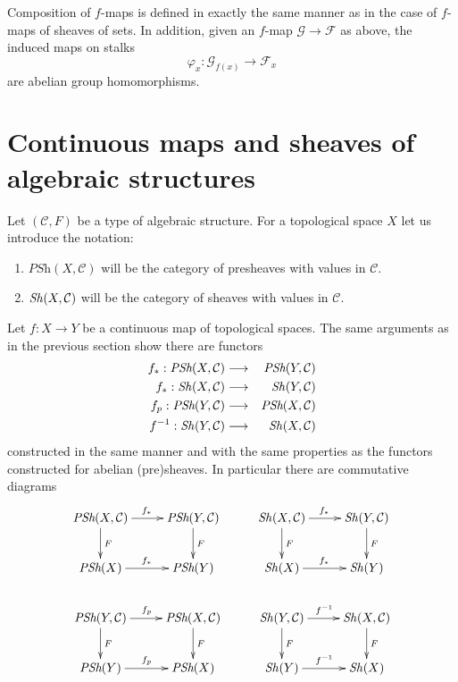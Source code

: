 \medskip\noindent
Composition of $f$-maps is defined in exactly the
same manner as in the case of $f$-maps of sheaves of
sets. In addition, given an $f$-map $\mathcal{G} \to \mathcal{F}$
as above, the induced maps on stalks
$$
\varphi_x : \mathcal{G}_{f(x)} \longrightarrow \mathcal{F}_x
$$
are abelian group homomorphisms.


\section{Continuous maps and sheaves of algebraic structures}
\label{section-presheaves-structures-functorial}

\noindent
Let $(\mathcal{C}, F)$ be a type of algebraic structure.
For a topological space $X$ let us introduce the notation:
\begin{enumerate}
\item $\textit{PSh}(X, \mathcal{C})$ will be the category
of presheaves with values in $\mathcal{C}$.
\item $\mathop{\mathit{Sh}}\nolimits(X, \mathcal{C})$ will be the category
of sheaves with values in $\mathcal{C}$.
\end{enumerate}
Let $f : X \to Y$ be a continuous map of topological spaces.
The same arguments as in the previous section show
there are functors
\begin{eqnarray*}
f_* : \textit{PSh}(X, \mathcal{C}) &
\longrightarrow &
\textit{PSh}(Y, \mathcal{C}) \\
f_* : \mathop{\mathit{Sh}}\nolimits(X, \mathcal{C}) &
\longrightarrow &
\mathop{\mathit{Sh}}\nolimits(Y, \mathcal{C}) \\
f_p : \textit{PSh}(Y, \mathcal{C}) &
\longrightarrow &
\textit{PSh}(X, \mathcal{C}) \\
f^{-1} : \mathop{\mathit{Sh}}\nolimits(Y, \mathcal{C}) &
\longrightarrow &
\mathop{\mathit{Sh}}\nolimits(X, \mathcal{C})
\end{eqnarray*}
constructed in the same manner and with the same
properties as the functors constructed for abelian
(pre)sheaves. In particular there are commutative diagrams
$$
\xymatrix{
\textit{PSh}(X, \mathcal{C}) \ar[r]^{f_*} \ar[d]^F &
\textit{PSh}(Y, \mathcal{C}) \ar[d]^F &
\Sh(X, \mathcal{C}) \ar[r]^{f_*} \ar[d]^F &
\Sh(Y, \mathcal{C}) \ar[d]^F
\\
\textit{PSh}(X) \ar[r]^{f_*} &
\textit{PSh}(Y) &
\Sh(X) \ar[r]^{f_*} &
\Sh(Y)
\\
\textit{PSh}(Y, \mathcal{C}) \ar[r]^{f_p} \ar[d]^F &
\textit{PSh}(X, \mathcal{C}) \ar[d]^F &
\Sh(Y, \mathcal{C}) \ar[r]^{f^{-1}} \ar[d]^F &
\Sh(X, \mathcal{C}) \ar[d]^F
\\
\textit{PSh}(Y) \ar[r]^{f_p} &
\textit{PSh}(X) &
\Sh(Y) \ar[r]^{f^{-1}} &
\Sh(X)
}
$$

